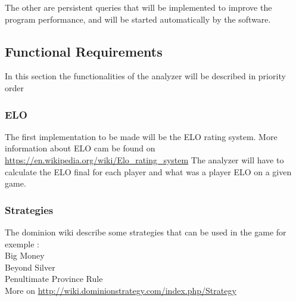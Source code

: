 \documentclass{scrreprt}
\begin{document}
The other are persistent queries that will be implemented to improve the program
performance, and will be started automatically by the software.


\subsection{Functional Requirements}


In this section the functionalities of the analyzer will be described in
priority order

\subsubsection{ELO}
The first implementation to be made will be the ELO rating system.
More information about ELO cam be found on \url{https://en.wikipedia.org/wiki/Elo_rating_system}
The analyzer will have to calculate the ELO final for each player and what was a
player ELO on a given game.

\subsubsection{Strategies}
The dominion wiki describe some strategies that can be used in the game for
exemple :\\
Big Money\\
Beyond Silver \\
Penultimate Province Rule \\
More on \url{http://wiki.dominionstrategy.com/index.php/Strategy}\\
\end{document}
